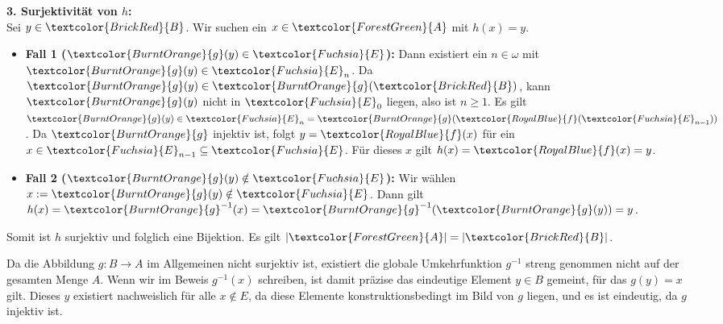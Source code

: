 \begin{math-stroke}
\begin{short-proof}
\textbf{3. Surjektivität von $h$:} \\
Sei $y \in \textcolor{BrickRed}{B}$. Wir suchen ein $x \in \textcolor{ForestGreen}{A}$ mit $h(x) = y$.
\begin{itemize}
    \item \textbf{Fall 1 ($\textcolor{BurntOrange}{g}(y) \in \textcolor{Fuchsia}{E}$):} Dann existiert ein $n \in \omega$ mit $\textcolor{BurntOrange}{g}(y) \in \textcolor{Fuchsia}{E}_n$. Da $\textcolor{BurntOrange}{g}(y) \in \textcolor{BurntOrange}{g}(\textcolor{BrickRed}{B})$, kann $\textcolor{BurntOrange}{g}(y)$ nicht in $\textcolor{Fuchsia}{E}_0$ liegen, also ist $n \ge 1$. Es gilt $\textcolor{BurntOrange}{g}(y) \in \textcolor{Fuchsia}{E}_n = \textcolor{BurntOrange}{g}(\textcolor{RoyalBlue}{f}(\textcolor{Fuchsia}{E}_{n-1}))$. Da $\textcolor{BurntOrange}{g}$ injektiv ist, folgt $y = \textcolor{RoyalBlue}{f}(x)$ für ein $x \in \textcolor{Fuchsia}{E}_{n-1} \subseteq \textcolor{Fuchsia}{E}$. Für dieses $x$ gilt $h(x) = \textcolor{RoyalBlue}{f}(x) = y$.
    \item \textbf{Fall 2 ($\textcolor{BurntOrange}{g}(y) \notin \textcolor{Fuchsia}{E}$):} Wir wählen $x := \textcolor{BurntOrange}{g}(y) \notin \textcolor{Fuchsia}{E}$. Dann gilt $h(x) = \textcolor{BurntOrange}{g}^{-1}(x) = \textcolor{BurntOrange}{g}^{-1}(\textcolor{BurntOrange}{g}(y)) = y$.
\end{itemize}
Somit ist $h$ surjektiv und folglich eine Bijektion. Es gilt $|\textcolor{ForestGreen}{A}| = |\textcolor{BrickRed}{B}|$.
\end{short-proof}
\end{math-stroke}

\begin{ai-note}
Da die Abbildung $g \colon B \to A$ im Allgemeinen nicht surjektiv ist, existiert die globale Umkehrfunktion $g^{-1}$ streng genommen nicht auf der gesamten Menge $A$. Wenn wir im Beweis $g^{-1}(x)$ schreiben, ist damit präzise das eindeutige Element $y \in B$ gemeint, für das $g(y) = x$ gilt. Dieses $y$ existiert nachweislich für alle $x \notin E$, da diese Elemente konstruktionsbedingt im Bild von $g$ liegen, und es ist eindeutig, da $g$ injektiv ist.
\end{ai-note}

